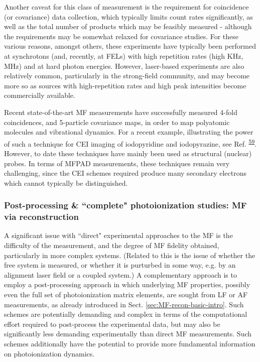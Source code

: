 \documentclass[10pt]{article}
\begin{document}
Another caveat for this class of measurement is the requirement for coincidence (or covariance) data collection, which typically limits count rates significantly, as well as the total number of products which may be feasibly measured - although the requirements may be somewhat relaxed for covariance studies. For these various reasons, amongst others, these experiments have typically been performed at synchrotons (and, recently, at FELs) with high repetition rates (high KHz, MHz) and at hard photon energies. However, laser-based experiments are also relatively common, particularly in the strong-field community, and may become more so as sources with high-repetition rates and high peak intensities become commercially available. 

Recent state-of-the-art MF measurements have successfully measured 4-fold coincidences, and 5-particle covariance maps, in order to map polyatomic molecules and vibrational dynamics. %
For a recent example, illustrating the power of such a technique for CEI imaging of iodopyridine and iodopyrazine, see Ref.   \textsuperscript{\hyperref[csl:59]{59}}. However, to date these techniques have mainly been used as structural (nuclear) probes. In terms of MFPAD measurements, these techniques remain very challenging, since the CEI schemes required produce many secondary electrons which cannot typically be distinguished. 



\subsubsection{Post-processing \& ``complete" photoionization studies: MF via reconstruction\label{sec:MF-recon-expt}}


A significant issue with ``direct" experimental approaches to the MF is the difficulty of the measurement, and the degree of MF fidelity obtained, particularly in more complex systems. (Related to this is the issue of whether the free system is measured, or whether it is purturbed in some way, e.g. by an alignment laser field or a coupled system.) A complementary approach is to employ a post-processing approach in which underlying MF properties, possibly even the full set of photoionization matrix elements, are sought from LF or AF measurements, as already introduced in Sect. \ref{sec:MF-recon-basic-intro}. Such schemes are potentially demanding and complex in terms of the computational effort required to post-process the experimental data, but may also be significantly less demanding experimentally than direct MF measurements. Such schemes additionally have the potential to provide more fundamental information on photoionization dynamics.
\end{document}
